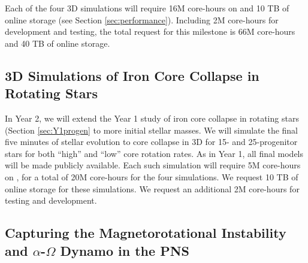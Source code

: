 Each of the four 3D simulations will require 16M core-hours on \mira and 10 TB of online storage (see Section \ref{sec:performance}).
Including 2M \mira core-hours for development and testing, the total request for this milestone is 66M \mira core-hours and 40 TB of online storage.



\subsection{3D Simulations of Iron Core Collapse in Rotating Stars}
\label{sec:Y2progen}

In Year 2, we will extend the Year 1 study of iron core collapse in rotating stars (Section \ref{sec:Y1progen} to more initial stellar masses.
We will simulate the final five minutes of stellar evolution to core collapse in 3D for 15- and 25-\msun progenitor stars for both ``high'' and ``low'' core rotation rates.
As in Year 1, all final models will be made publicly available.
Each such simulation will require 5M core-hours on \mira, for a total of 20M core-hours for the four simulations.
We request 10 TB of online storage for these simulations.
We request an additional 2M core-hours for testing and development.

\subsection{Capturing the Magnetorotational Instability and $\alpha$-$\Omega$ Dynamo in the PNS}

